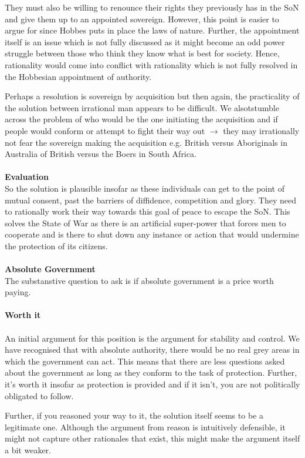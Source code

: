 \documentclass[12pt, letterpaper]{article}
\begin{document}
They must also be willing to renounce their rights they previously has in the SoN and give them up to an appointed sovereign. However, this point is easier to argue for since Hobbes puts in place the laws of nature. Further, the appointment itself is an issue which is not fully discussed as it might become an odd power struggle between those who think they know what is best for society. Hence, rationality would come into conflict with rationality which is not fully resolved in the Hobbesian appointment of authority.

Perhaps a resolution is sovereign by acquisition but then again, the practicality of the solution between irrational man appears to be difficult. We alsotstumble across the problem of who would be the one initiating the acquisition and if people would conform or attempt to fight their way out $\rightarrow$ they may irrationally not fear the sovereign making the acquisition e.g. British versus Aboriginals in Australia of British versus the Boers in South Africa.\\\\
\textbf{Evaluation}\\
So the solution is plausible insofar as these individuals can get to the point of mutual consent, past the barriers of diffidence, competition and glory. They need to rationally work their way towards this goal of peace to escape the SoN. This solves the State of War as there is an artificial super-power that forces men to cooperate and is there to shut down any instance or action that would undermine the protection of its citizens.\\\\
\textbf{Absolute Government}\\
The substanstive question to ask is if absolute government is a price worth paying.\\\\
\textbf{Worth it}\\\\
An initial argument for this position is the argument for stability and control. We have recognised that with absolute authority, there would be no real grey areas in which the government can act. This means that there are less questions asked about the government as long as they conform to the task of protection. Further, it's worth it insofar as protection is provided and if it isn't, you are not politically obligated to follow.

Further, if you reasoned your way to it, the solution itself seems to be a legitimate one. Although the argument from reason is intuitively defensible, it might not capture other rationales that exist, this might make the argument itself a bit weaker.
\end{document}
